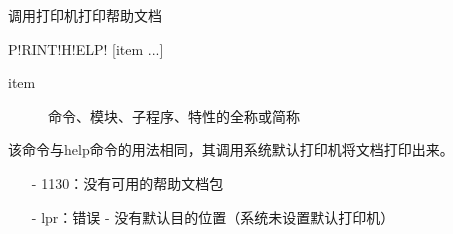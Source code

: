 \label{cmd:printhelp}

调用打印机打印帮助文档

\begin{SACSTX}
P!RINT!H!ELP! [item ...]
\end{SACSTX}

\begin{description}
\item [item] 命令、模块、子程序、特性的全称或简称
\end{description}

该命令与help命令的用法相同，其调用系统默认打印机将文档打印出来。

\begin{itemize}
\item[-]1130：没有可用的帮助文档包
\item[-]lpr：错误 - 没有默认目的位置（系统未设置默认打印机）
\end{itemize}
